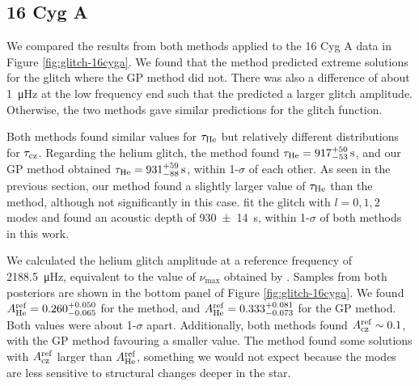 
\subsection{16 Cyg A}

We compared the results from both methods applied to the 16 Cyg A data in Figure \ref{fig:glitch-16cyga}. We found that the  method predicted extreme solutions for the glitch where the GP method did not. There was also a difference of about \SI{1}{\micro\hertz} at the low frequency end such that the  predicted a larger glitch amplitude. Otherwise, the two methods gave similar predictions for the glitch function.

Both methods found similar values for \(\tau_{{\mathrm{He}}}\) but relatively different distributions for \(\tau_{{\mathrm{cz}}}\). Regarding the helium glitch, the  method found \(\tau_{{\mathrm{He}}} = 917_{-53}^{+50} \, \mathrm{s}\), and our GP method obtained \(\tau_{{\mathrm{He}}} = 931_{-88}^{+59} \, \mathrm{s}\), within 1-\(\sigma\) of each other. As seen in the previous section, our method found a slightly larger value of \(\tau_{{\mathrm{He}}}\) than the  method, although not significantly in this case. \citet{Verma.Faria.ea2014} fit the glitch with \(l=0,1,2\) modes and found an acoustic depth of \SI{930(14)}{\second}, within 1-\(\sigma\) of both methods in this work.

We calculated the helium glitch amplitude at a reference frequency of \SI{2188.5}{\micro\hertz}, equivalent to the value of \(\nu_{\max}\) obtained by \citet{Lund.SilvaAguirre.ea2017}. Samples from both posteriors are shown in the bottom panel of Figure \ref{fig:glitch-16cyga}. We found \(A_{{\mathrm{He}}}^\mathrm{ref} = 0.260_{-0.065}^{+0.050}\) for the  method, and \(A_{{\mathrm{He}}}^\mathrm{ref} = 0.333_{-0.073}^{+0.081}\) for the GP method. Both values were about 1-\(\sigma\) apart. Additionally, both methods found \(A_{{\mathrm{cz}}}^\mathrm{ref} \sim 0.1\), with the GP method favouring a smaller value. The  method found some solutions with \(A_{{\mathrm{cz}}}^\mathrm{ref}\) larger than \(A_{{\mathrm{He}}}^\mathrm{ref}\), something we would not expect because the modes are less sensitive to structural changes deeper in the star.

